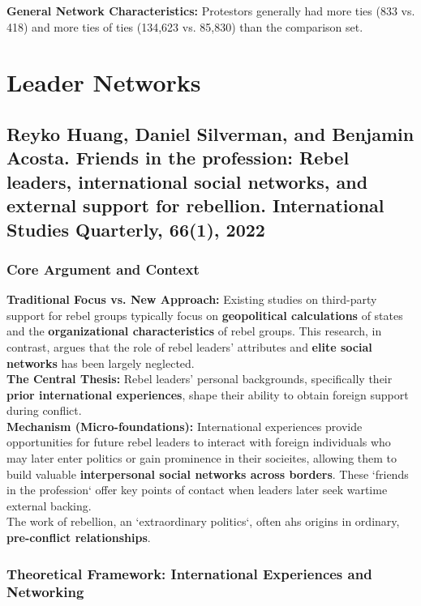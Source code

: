 \documentclass{article}
\begin{document}
    \noindent \textbf{General Network Characteristics:} Protestors generally
had more ties (833 vs. 418) and more ties of ties (134,623 vs. 85,830) than
the comparison set.

    \section{Leader Networks}

    \subsection{Reyko Huang, Daniel Silverman, and Benjamin Acosta. Friends in the profession: Rebel leaders, international social networks, and external support for rebellion. International Studies Quarterly, 66(1), 2022}

    \subsubsection{Core Argument and Context}
    \noindent \textbf{Traditional Focus vs. New Approach:} Existing studies
on third-party support for rebel groups typically focus on
\textbf{geopolitical calculations} of states and the
\textbf{organizational characteristics} of rebel groups. This research, in
contrast, argues that the role of rebel leaders' attributes and
\textbf{elite social networks} has been largely neglected.\\

    \noindent \textbf{The Central Thesis:} Rebel leaders' personal
backgrounds, specifically their \textbf{prior international experiences},
shape their ability to obtain foreign support during conflict.\\

    \noindent \textbf{Mechanism (Micro-foundations):} International
experiences provide opportunities for future rebel leaders to interact with
foreign individuals who may later enter politics or gain prominence in their
socieites, allowing them to build valuable
\textbf{interpersonal social networks across borders}. These `friends in the
profession` offer key points of contact when leaders later seek wartime
external backing.\\

    \noindent The work of rebellion, an `extraordinary politics`, often ahs
origins in ordinary, \textbf{pre-conflict relationships}.

    \subsubsection{Theoretical Framework: International Experiences and Networking}
\end{document}
